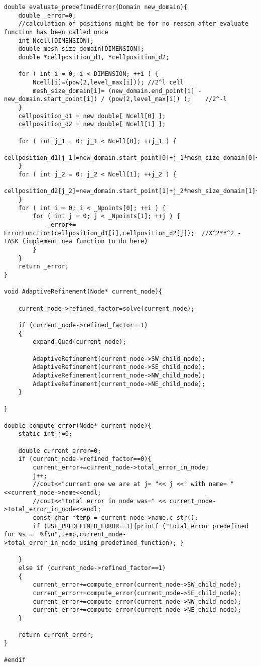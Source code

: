 \begin{lstlisting}[caption= Source code for solution, label=code:sol]
double evaluate_predefinedError(Domain new_domain){
	double _error=0;
	//calculation of positions might be for no reason after evaluate function has been called once
	int Ncell[DIMENSION];
	double mesh_size_domain[DIMENSION];
	double *cellposition_d1, *cellposition_d2;

	for ( int i = 0; i < DIMENSION; ++i ) {
		Ncell[i]=(pow(2,level_max[i]));	//2^l cell
		mesh_size_domain[i]= (new_domain.end_point[i] - new_domain.start_point[i]) / (pow(2,level_max[i]) );	//2^-l
	}
	cellposition_d1 = new double[ Ncell[0] ];
	cellposition_d2 = new double[ Ncell[1] ];

	for ( int j_1 = 0; j_1 < Ncell[0]; ++j_1 ) {
		cellposition_d1[j_1]=new_domain.start_point[0]+j_1*mesh_size_domain[0]+mesh_size_domain[0]/2.0;
	}
	for ( int j_2 = 0; j_2 < Ncell[1]; ++j_2 ) {
		cellposition_d2[j_2]=new_domain.start_point[1]+j_2*mesh_size_domain[1]+mesh_size_domain[1]/2.0;
	}
	for ( int i = 0; i < _Npoints[0]; ++i ) {
		for ( int j = 0; j < _Npoints[1]; ++j ) {
			_error+= ErrorFunction(cellposition_d1[i],cellposition_d2[j]);  //X^2*Y^2 - TASK (implement new function to do here)
		}
	}
	return _error;
}

void AdaptiveRefinement(Node* current_node){

	current_node->refined_factor=solve(current_node);

	if (current_node->refined_factor==1)
	{
		expand_Quad(current_node);

		AdaptiveRefinement(current_node->SW_child_node);
		AdaptiveRefinement(current_node->SE_child_node);
		AdaptiveRefinement(current_node->NW_child_node);
		AdaptiveRefinement(current_node->NE_child_node);
	}

}

double compute_error(Node* current_node){
	static int j=0;

	double current_error=0;
	if (current_node->refined_factor==0){
		current_error+=current_node->total_error_in_node;
		j++;
		//cout<<"current one we are at j= "<< j <<" with name= "<<current_node->name<<endl;
		//cout<<"total error in node was=" << current_node->total_error_in_node<<endl;
		const char *temp = current_node->name.c_str();
		if (USE_PREDEFINED_ERROR==1){printf ("total error predefined for %s =  %f\n",temp,current_node->total_error_in_node_using_predefined_function);	}

	}
	else if (current_node->refined_factor==1)
	{
		current_error+=compute_error(current_node->SW_child_node);
		current_error+=compute_error(current_node->SE_child_node);
		current_error+=compute_error(current_node->NW_child_node);
		current_error+=compute_error(current_node->NE_child_node);
	}

	return current_error;
}

#endif

\end{lstlisting}

